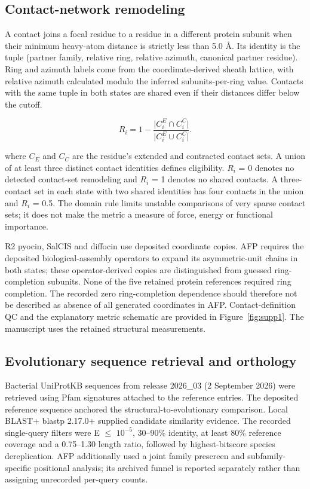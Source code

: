 \documentclass[11pt,a4paper]{article}
\begin{document}
\subsection{Contact-network remodeling}

A contact joins a focal residue to a residue in a different protein subunit when their minimum heavy-atom distance is strictly less than 5.0 \AA{}. Its identity is the tuple (partner family, relative ring, relative azimuth, canonical partner residue). Ring and azimuth labels come from the coordinate-derived sheath lattice, with relative azimuth calculated modulo the inferred subunits-per-ring value. Contacts with the same tuple in both states are shared even if their distances differ below the cutoff.

\begin{equation}
R_i=1-\frac{\lvert C_i^E\cap C_i^C\rvert}{\lvert C_i^E\cup C_i^C\rvert}.
\label{eq:remodeling}
\end{equation}

where \(C_E\) and \(C_C\) are the residue's extended and contracted contact sets. A union of at least three distinct contact identities defines eligibility. \(R_i\) = 0 denotes no detected contact-set remodeling and \(R_i\) = 1 denotes no shared contacts. A three-contact set in each state with two shared identities has four contacts in the union and \(R_i\) = 0.5. The domain rule limits unstable comparisons of very sparse contact sets; it does not make the metric a measure of force, energy or functional importance.

R2 pyocin, SalCIS and diffocin use deposited coordinate copies. AFP requires the deposited biological-assembly operators to expand its asymmetric-unit chains in both states; these operator-derived copies are distinguished from guessed ring-completion subunits. None of the five retained protein references required ring completion. The recorded zero ring-completion dependence should therefore not be described as absence of all generated coordinates in AFP. Contact-definition QC and the explanatory metric schematic are provided in Figure~\ref{fig:supp1}. The manuscript uses the retained structural measurements.

\subsection{Evolutionary sequence retrieval and orthology}

Bacterial UniProtKB sequences from release 2026\_03 (2 September 2026) were retrieved using Pfam signatures attached to the reference entries.\cite{ref10,ref11} The deposited reference sequence anchored the structural-to-evolutionary comparison. Local BLAST+ blastp 2.17.0+ supplied candidate similarity evidence.\cite{ref12} The recorded single-query filters were E \ensuremath{\leq} \(10^{-5}\), 30--90\% identity, at least 80\% reference coverage and a 0.75--1.30 length ratio, followed by highest-bitscore species dereplication. AFP additionally used a joint family prescreen and subfamily-specific positional analysis; its archived funnel is reported separately rather than assigning unrecorded per-query counts.
\end{document}
